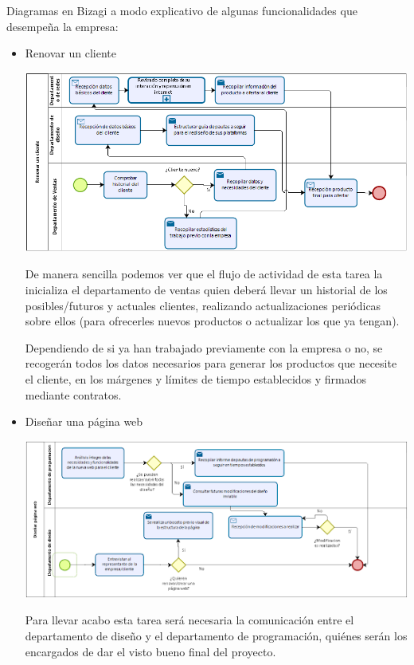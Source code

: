 \documentclass{article}
\begin{document}
Diagramas en Bizagi a modo explicativo de algunas funcionalidades que desempeña la empresa: 

\begin{itemize}
\item Renovar un cliente
\begin{center}
\includegraphics[scale=0.5]{images/cliente.png}
\end{center}
De manera sencilla podemos ver que el flujo de actividad de esta tarea la inicializa el departamento de ventas quien deberá llevar un historial de los posibles/futuros y actuales clientes, realizando actualizaciones periódicas sobre ellos (para ofrecerles nuevos productos o actualizar los que ya tengan). 

Dependiendo de si ya han trabajado previamente con la empresa o no, se recogerán todos los datos necesarios para generar los productos que necesite el cliente, en los márgenes y límites de tiempo establecidos y firmados mediante contratos.
\item Diseñar una página web
\begin{center}
\includegraphics[scale=0.5]{images/web.png}
\end{center}
Para llevar acabo esta tarea será necesaria la comunicación entre el departamento de diseño y el departamento de programación, quiénes serán los encargados de dar el visto bueno final del proyecto. 


\end{itemize}
\end{document}
